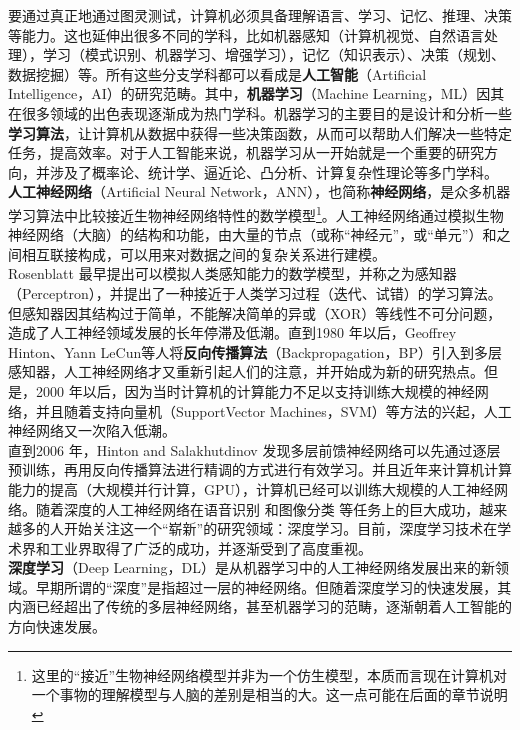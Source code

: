 \documentclass[11pt,fleqn, UTF8]{ctexbook} %
\begin{document}
要通过真正地通过图灵测试，计算机必须具备理解语言、学习、记忆、推理、决策等能力。这也延伸出很多不同的学科，比如机器感知（计算机视觉、自然语言处理），学习（模式识别、机器学习、增强学习），记忆（知识表示）、决策（规划、数据挖掘）等。所有这些分支学科都可以看成是\textbf{人工智能}（Artificial Intelligence，AI）的研究范畴。其中，\textbf{机器学习}（Machine Learning，ML）因其在很多领域的出色表现逐渐成为热门学科。机器学习的主要目的是设计和分析一些\textbf{学习算法}，让计算机从数据中获得一些决策函数，从而可以帮助人们解决一些特定任务，提高效率。对于人工智能来说，机器学习从一开始就是一个重要的研究方向，并涉及了概率论、统计学、逼近论、凸分析、计算复杂性理论等多门学科。\\

\textbf{人工神经网络}（Artificial Neural Network，ANN），也简称\textbf{神经网络}，是众多机器学习算法中比较接近生物神经网络特性的数学模型\footnote{这里的“接近”生物神经网络模型并非为一个仿生模型，本质而言现在计算机对一个事物的理解模型与人脑的差别是相当的大。这一点可能在后面的章节说明}。人工神经网络通过模拟生物神经网络（大脑）的结构和功能，由大量的节点（或称“神经元”，或“单元”）和之间相互联接构成，可以用来对数据之间的复杂关系进行建模。\\

Rosenblatt\cite{rosenblatt1958perceptron} 最早提出可以模拟人类感知能力的数学模型，并称之为感知器（Perceptron），并提出了一种接近于人类学习过程（迭代、试错）的学习算法。但感知器因其结构过于简单，不能解决简单的异或（XOR）等线性不可分问题，造成了人工神经领域发展的长年停滞及低潮。直到1980 年以后，Geoffrey Hinton、Yann LeCun等人将\textbf{反向传播算法}（Backpropagation，BP）引入到多层感知器\cite{rumelhart1988learning}，人工神经网络才又重新引起人们的注意，并开始成为新的研究热点。但是，2000 年以后，因为当时计算机的计算能力不足以支持训练大规模的神经网络，并且随着支持向量机（SupportVector Machines，SVM）等方法的兴起，人工神经网络又一次陷入低潮。\\

直到2006 年，Hinton and Salakhutdinov \cite[]{hinton2006reducing} 发现多层前馈神经网络可以先通过逐层预训练，再用反向传播算法进行精调的方式进行有效学习。并且近年来计算机计算能力的提高（大规模并行计算，GPU），计算机已经可以训练大规模的人工神经网络。随着深度的人工神经网络在语音识别\cite{hinton2012deep} 和图像分类\cite{krizhevsky2012imagenet} 等任务上的巨大成功，越来越多的人开始关注这一个“崭新”的研究领域：深度学习。目前，深度学习技术在学术界和工业界取得了广泛的成功，并逐渐受到了高度重视。\\

\textbf{深度学习}（Deep Learning，DL）是从机器学习中的人工神经网络发展出来的新领域。早期所谓的“深度”是指超过一层的神经网络。但随着深度学习的快速发展，其内涵已经超出了传统的多层神经网络，甚至机器学习的范畴，逐渐朝着人工智能的方向快速发展。\\
\end{document}
